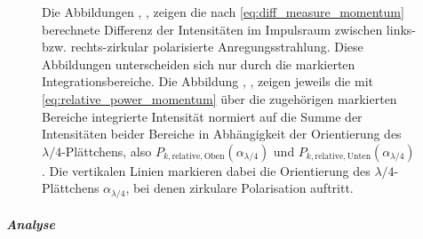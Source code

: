 \documentclass[titlepage,  ngerman]{article}
\begin{document}
\begin{figure}
			\caption[PSHE Messung]{Die Abbildungen , ,  zeigen die nach \eqref{eq:diff_measure_momentum} berechnete Differenz der Intensitäten im Impulsraum zwischen links- bzw. rechts-zirkular polarisierte Anregungsstrahlung. Diese Abbildungen unterscheiden sich nur durch die markierten Integrationsbereiche. Die Abbildung , ,  zeigen jeweils die mit \eqref{eq:relative_power_momentum} über die zugehörigen markierten Bereiche integrierte Intensität normiert auf die Summe der Intensitäten beider Bereiche in Abhängigkeit der Orientierung des $\lambda/4$-Plättchens, also $P_{k, \mathrm{relative}, \mathrm{Oben}}(\alpha_{\lambda/4})$ und $P_{k, \mathrm{relative}, \mathrm{Unten}}(\alpha_{\lambda/4})$. Die vertikalen Linien markieren dabei die Orientierung des $\lambda/4$-Plättchens $\alpha_{\lambda/4}$, bei denen zirkulare Polarisation auftritt.}	
			\label{fig:spin_hall_measure}	
		\end{figure}
		\subparagraph{Analyse}
\end{document}
